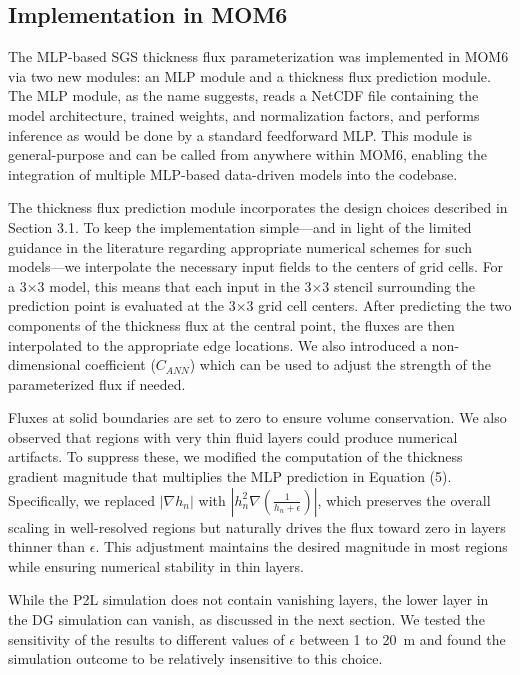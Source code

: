 \documentclass[draft]{agujournal2019}
\begin{document}
\subsection{Implementation in MOM6}
The MLP-based SGS thickness flux parameterization was implemented in MOM6 via two new modules: an MLP module and a thickness flux prediction module. The MLP module, as the name suggests, reads a NetCDF file containing the model architecture, trained weights, and normalization factors, and performs inference as would be done by a standard feedforward MLP. This module is general-purpose and can be called from anywhere within MOM6, enabling the integration of multiple MLP-based data-driven models into the codebase.

The thickness flux prediction module incorporates the design choices described in Section 3.1. To keep the implementation simple—and in light of the limited guidance in the literature regarding appropriate numerical schemes for such models—we interpolate the necessary input fields to the centers of grid cells. For a 3×3 model, this means that each input in the 3×3 stencil surrounding the prediction point is evaluated at the 3×3 grid cell centers. After predicting the two components of the thickness flux at the central point, the fluxes are then interpolated to the appropriate edge locations.
We also introduced a non-dimensional coefficient ($C_{ANN}$) which can be used to adjust the strength of the parameterized flux if needed.

Fluxes at solid boundaries are set to zero to ensure volume conservation. We also observed that regions with very thin fluid layers could produce numerical artifacts. To suppress these, we modified the computation of the thickness gradient magnitude that multiplies the MLP prediction in Equation (5). Specifically, we replaced $|\nabla h_n|$ with $\left|h_n^2 \nabla\left(\frac{1}{h_n + \epsilon}\right)\right|$, which preserves the overall scaling in well-resolved regions but naturally drives the flux toward zero in layers thinner than $\epsilon$. This adjustment maintains the desired magnitude in most regions while ensuring numerical stability in thin layers.

While the P2L simulation does not contain vanishing layers, the lower layer in the DG simulation can vanish, as discussed in the next section. We tested the sensitivity of the results to different values of $\epsilon$ between 1 to 20~m and found the simulation outcome to be relatively insensitive to this choice.
\end{document}
